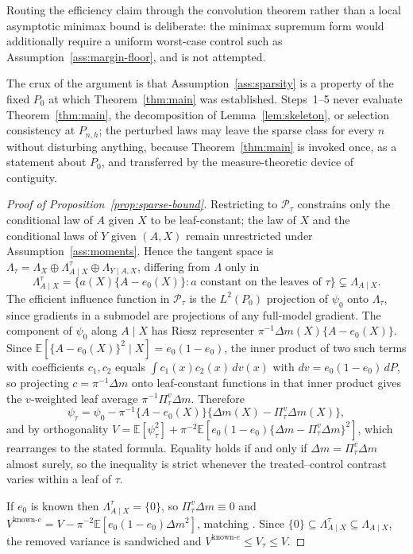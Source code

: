 \documentclass[11pt]{article}
\theoremstyle{plain}
\theoremstyle{definition}
\theoremstyle{remark}
\newcommand{\E}{\mathbb{E}}
\newcommand{\cP}{\mathcal{P}}
\newcommand{\ez}{e_0}
\begin{document}
\noindent Routing the efficiency claim through the convolution theorem rather
than a local asymptotic minimax bound is deliberate: the minimax supremum form
would additionally require a uniform worst-case control such as
Assumption~\ref{ass:margin-floor}, and is not attempted.

The crux of the argument is that Assumption~\ref{ass:sparsity} is a property of
the fixed $P_0$ at which Theorem~\ref{thm:main} was established. Steps~1--5 never
evaluate Theorem~\ref{thm:main}, the decomposition of
Lemma~\ref{lem:skeleton}, or selection consistency at $P_{n,h}$; the perturbed
laws may leave the sparse class for every $n$ without disturbing anything,
because Theorem~\ref{thm:main} is invoked once, as a statement about $P_0$, and
transferred by the measure-theoretic device of contiguity.

\begin{proof}[Proof of Proposition~\ref{prop:sparse-bound}]
Restricting to $\cP_\tau$ constrains only the conditional law of $A$ given $X$ to
be leaf-constant; the law of $X$ and the conditional laws of $Y$ given $(A,X)$
remain unrestricted under Assumption~\ref{ass:moments}. Hence the tangent space
is $\Lambda_\tau=\Lambda_X\oplus\Lambda^\tau_{A\mid X}\oplus\Lambda_{Y\mid A,X}$,
differing from $\Lambda$ only in
\[
  \Lambda^\tau_{A\mid X}
  =\bigl\{a(X)\{A-\ez(X)\}:a\text{ constant on the leaves of }\tau\bigr\}
  \subsetneq\Lambda_{A\mid X}.
\]
The efficient influence function in $\cP_\tau$ is the $L^2(P_0)$ projection of
$\psi_0$ onto $\Lambda_\tau$, since gradients in a submodel are projections of any
full-model gradient. The component of $\psi_0$ along $A\mid X$ has Riesz
representer $\pi^{-1}\Delta m(X)\{A-\ez(X)\}$. Since
$\E[\{A-\ez(X)\}^2\mid X]=\ez(1-\ez)$, the inner product of two such terms with
coefficients $c_1,c_2$ equals $\int c_1(x)c_2(x)\,dv(x)$ with
$dv=\ez(1-\ez)\,dP$, so projecting $c=\pi^{-1}\Delta m$ onto
leaf-constant functions in that inner product gives the $v$-weighted leaf
average $\pi^{-1}\Pi^v_\tau\Delta m$. Therefore
\[
  \psi_\tau=\psi_0-\pi^{-1}\{A-\ez(X)\}
   \bigl\{\Delta m(X)-\Pi^v_\tau\Delta m(X)\bigr\},
\]
and by orthogonality
$V=\E[\psi_\tau^2]+\pi^{-2}\E[\ez(1-\ez)\{\Delta m-\Pi^v_\tau\Delta m\}^2]$,
which rearranges to the stated formula. Equality holds if and only if
$\Delta m=\Pi^v_\tau\Delta m$ almost surely, so the inequality is strict whenever
the treated--control contrast varies within a leaf of $\tau$.

If $\ez$ is known then $\Lambda^\tau_{A\mid X}=\{0\}$, so
$\Pi^v_\tau\Delta m\equiv0$ and
$V^{\mathrm{known}\text{-}e}=V-\pi^{-2}\E[\ez(1-\ez)\Delta m^2]$, matching
\citet{hahn1998}. Since
$\{0\}\subseteq\Lambda^\tau_{A\mid X}\subseteq\Lambda_{A\mid X}$, the removed
variance is sandwiched and $V^{\mathrm{known}\text{-}e}\le V_\tau\le V$.
\end{proof}
\end{document}
